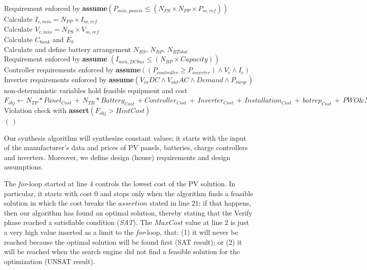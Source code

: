 \documentclass[runningheads]{llncs}
\begin{document}
\begin{algorithm}
\begin{algorithmic}[1]
	\STATE Requirement enforced by \textbf{assume}$(P_{min,panels} \leq (N_{PS} \times N_{PP} \times P_{m,ref}))$ \\
	\STATE Calculate $I_{c,min} = N_{PP} \times I_{m,ref}$ \\
	\STATE Calculate $V_{c,min} = N_{PS} \times V_{m,ref}$ \\
 	\STATE Calculate $C_{bank}$ and $E_{b}$ \\
	\STATE Calculate and define battery arrangement $N_{BS}, \, N_{BP}, \, N_{BTotal}$ \\
	\STATE Requirement enforced by \textbf{assume} $(I_{min,DCbus} \leq (N_{BP} \times Capacity))$ \\
 	\STATE Controller requirements enforced by \textbf{assume}$((P_{controller} \geq P_{inverter}) \wedge V_{c} \wedge I_{c})$ \\
	\STATE Inverter requirements enforced by \textbf{assume}$(V_{in}DC \wedge V_{out}AC \wedge Demand \wedge P_{surge})$ \\
	\STATE non-deterministic variables hold feasible equipment and cost  \\
	\STATE $F_{obj} \leftarrow  N_{TP}*Panel_{Cost} \, + \, N_{TB}*Battery_{Cost} \, + Controller_{Cost} \, + \, Inverter_{Cost} \, + \, Installation_{Cost} \, + \, batrep_{Cost} \, + \, PWO\&M_{Cost}$ \\
	\STATE Violation check with \textbf{assert}$(F_{obj} > HintCost)$ \\
  \ENDFOR
 \RETURN $(\,)$ 
 \end{algorithmic} 
 \label{alg:opt-algorithm}
 \end{algorithm}

Our synthesis algorithm will synthesize constant values; 
it starts with the input of the manufacturer's data and prices of PV panels, batteries, charge controllers and inverters. Moreover, we define design (house) requirements and design assumptions. 

The \textit{for}-loop started at line $4$ controls the lowest cost of the PV solution. In particular, it starts with cost $0$ and stops only when the algorithm finds a feasible solution in which the cost breaks the $assertion$ stated in line $21$; if that happens, then our algorithm has found an optimal solution, thereby stating that the {\sc Verify} phase reached a satisfiable condition (\textit{SAT}). The $MaxCost$ value at line $2$ is just a very high value inserted as a limit to the \textit{for}-loop, that: (1) it will never be reached because the optimal solution will be found first (SAT result); or (2) it will be reached when the search engine did not find a feasible solution for the optimization (UNSAT result).
\end{document}
